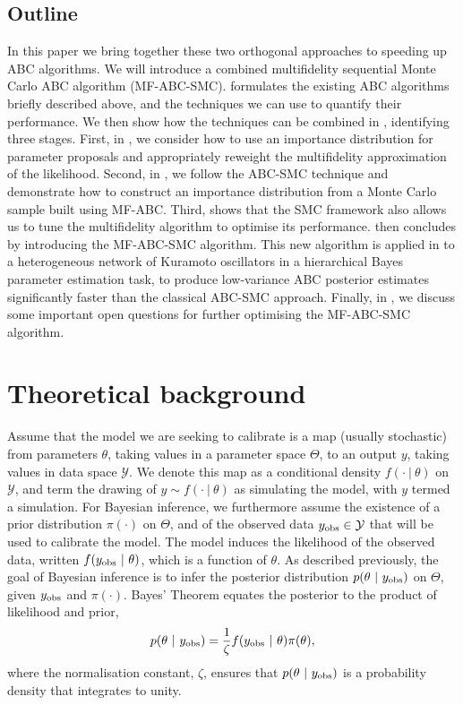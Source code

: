 \documentclass[review,demo]{siamonline190516}
\begin{document}
\subsection{Outline}
\label{s:Outline}
In this paper we bring together these two orthogonal approaches to speeding up ABC algorithms.
We will introduce a combined multifidelity sequential Monte Carlo ABC algorithm (MF-ABC-SMC).
 formulates the existing ABC algorithms briefly described above, and the techniques we can use to quantify their performance.
We then show how the techniques can be combined in , identifying three stages.
First, in , we consider how to use an importance distribution for parameter proposals and appropriately reweight the multifidelity approximation of the likelihood.
Second, in , we follow the ABC-SMC technique and demonstrate how to construct an importance distribution from a Monte Carlo sample built using MF-ABC.
Third,  shows that the SMC framework also allows us to tune the multifidelity algorithm to optimise its performance.
 then concludes by introducing the MF-ABC-SMC algorithm. 
This new algorithm is applied in  to a heterogeneous network of Kuramoto oscillators in a hierarchical Bayes parameter estimation task, to produce low-variance ABC posterior estimates significantly faster than the classical ABC-SMC approach.
Finally, in , we discuss some important open questions for further optimising the MF-ABC-SMC algorithm.

\section{Theoretical background}
\label{s:Background}

Assume that the model we are seeking to calibrate is a map (usually stochastic) from parameters $\theta$, taking values in a parameter space $\Theta$, to an output $y$, taking values in data space $\mathcal Y$.
We denote this map as a conditional density $f(\cdot~|~\theta)$ on $\mathcal Y$, and term the drawing of $y \sim f(\cdot~|~\theta)$ as simulating the model, with $y$ termed a simulation.
For Bayesian inference, we furthermore assume the existence of a prior distribution $\pi(\cdot)$ on $\Theta$, and of the observed data $y_{\mathrm{obs}} \in \mathcal Y$ that will be used to calibrate the model.
The model induces the likelihood of the observed data, written $f(y_{\mathrm{obs}}~|~\theta)$, which is a function of $\theta$.
As described previously, the goal of Bayesian inference is to infer the posterior distribution $p(\theta~|~y_{\mathrm{obs}})$ on $\Theta$, given $y_{\mathrm{obs}}$ and $\pi(\cdot)$.
Bayes' Theorem equates the posterior to the product of likelihood and prior,
\[
p( \theta ~|~ y_{\mathrm{obs}}) = \frac{1}{\zeta} f(y_{\mathrm{obs}}~|~\theta) \pi(\theta),
\]
where the normalisation constant, $\zeta$, ensures that $p(\theta~|~y_{\mathrm{obs}})$ is a probability density that integrates to unity.
\end{document}
